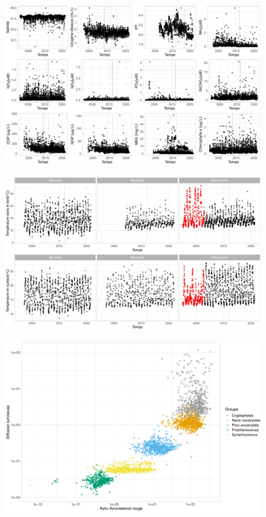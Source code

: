 \documentclass[12pt]{article}
\begin{document}
\begin{figure}
\centering
\includegraphics[width=\textwidth]{fig/visualisation_hydro.pdf}
\caption{}
\end{figure}

\begin{figure}
\centering
\includegraphics[width=.9\textwidth]{fig/visualisation_T.pdf}
\caption{}
\end{figure}


\begin{figure}
\centering
\includegraphics[width=.75 \textwidth]{fig/visualisation_phyto.pdf}
\caption{}
\end{figure}
\end{document}
